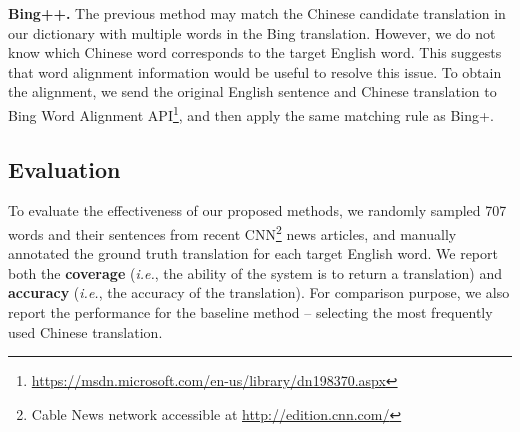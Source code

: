 \begin{CJK}{UTF8}{gbsn}
{\bf Bing++.} %
The previous method may match the Chinese candidate translation in our dictionary with multiple words in the Bing translation. However, we do not know which Chinese word corresponds to the target English word. This suggests that word alignment information would be useful to resolve this issue. To obtain the alignment, we send the original English sentence and Chinese translation to Bing Word Alignment API\footnote{\url{https://msdn.microsoft.com/en-us/library/dn198370.aspx}}, and then apply the same matching rule as Bing+.



\subsection{Evaluation}
To evaluate the effectiveness of our proposed  methods, we randomly sampled 707 words and their sentences from recent CNN\footnote{Cable News network accessible at \url{http://edition.cnn.com/}} news articles, and manually annotated the ground truth translation for each target English word. We report both the {\bf coverage} ({\it i.e.}, the ability of the system is to return a translation) and {\bf accuracy} ({\it i.e.}, the accuracy of the translation). For comparison purpose, we also report the performance for the baseline method -- selecting the most frequently used Chinese translation.


\end{CJK}
